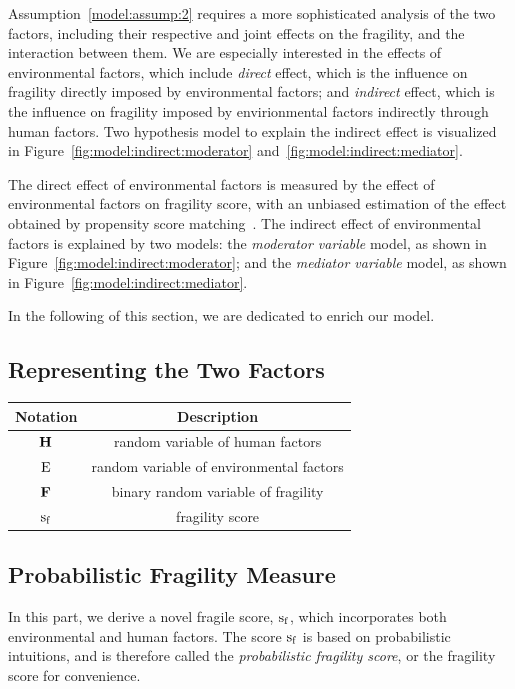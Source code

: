 Assumption~\ref{model:assump:2} requires a more sophisticated analysis of the two factors, including their respective and joint effects on the fragility, and the interaction between them. We are especially interested in the effects of environmental factors, which include \emph{direct} effect, which is the influence on fragility directly imposed by environmental factors; and \emph{indirect} effect, which is the influence on fragility imposed by envirionmental factors indirectly through human factors. Two hypothesis model to explain the indirect effect is visualized in Figure~\ref{fig:model:indirect:moderator} and~\ref{fig:model:indirect:mediator}.

The direct effect of environmental factors is measured by the effect of environmental factors on fragility score, with an unbiased estimation of the effect obtained by propensity score matching~. The indirect effect of environmental factors is explained by two models: the \emph{moderator variable} model, as shown in Figure~\ref{fig:model:indirect:moderator}; and the \emph{mediator variable} model, as shown in Figure~\ref{fig:model:indirect:mediator}.


In the following of this section, we are dedicated to enrich our model.

\subsection{Representing the Two Factors}
\label{sec:model:rep}
\begin{table}[htbp]
   \centering
   \begin{tabular}{|c|c|} \hline 
      Notation & Description \\ \hline
      $\operatorname*{\mathbf{H}} $  & random variable of human factors \\ \hline
      $\operatorname*{E} $ & random variable of environmental factors \\ \hline
      $ \operatorname*{\mathbf{F}} $ & binary random variable of fragility \\ \hline
      $\operatorname*{s_f} $ & fragility score \\ \hline
   \end{tabular}
\end{table}

\subsection{Probabilistic Fragility Measure}
\label{sec:model:frag}
In this part, we derive a novel fragile score, $\operatorname*{s_f}$, which incorporates both environmental and human factors. The score $\operatorname*{s_f}$ is based on probabilistic intuitions, and is therefore called the \emph{probabilistic fragility score}, or the fragility score for convenience.


